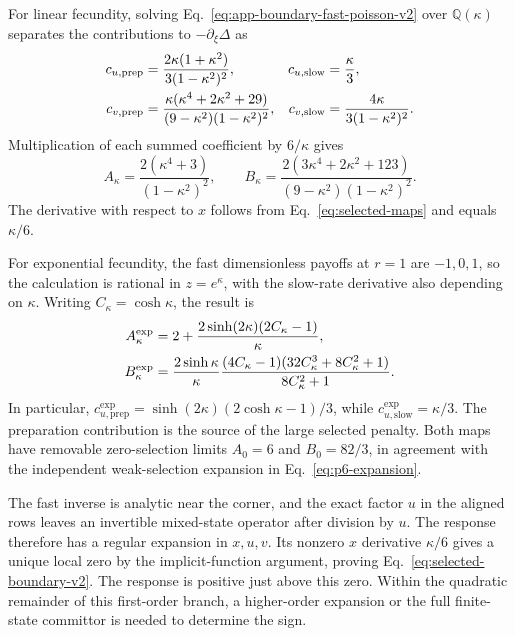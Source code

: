 \documentclass[aps,pre,reprint,amsmath,amssymb,longbibliography]{revtex4-2}
\begin{document}
For linear fecundity, solving
Eq.~\eqref{eq:app-boundary-fast-poisson-v2}
over \(\mathbb Q(\kappa)\) separates the
contributions to \(-\partial_\xi\Delta\) as
\begin{align}
 c_{u,\mathrm{prep}}
 &=\frac{2\kappa(1+\kappa^2)}{3(1-\kappa^2)^2},
 &c_{u,\mathrm{slow}}&=\frac{\kappa}{3}, \label{eq:app-boundary-decomposition-v2}\\
 c_{v,\mathrm{prep}}
 &=\frac{\kappa(\kappa^4+2\kappa^2+29)}
 {(9-\kappa^2)(1-\kappa^2)^2},
 &c_{v,\mathrm{slow}}&=\frac{4\kappa}{3(1-\kappa^2)^2}. \notag
\end{align}
Multiplication of each summed coefficient
by \(6/\kappa\) gives
\begin{equation}
 A_\kappa=\frac{2(\kappa^4+3)}{(1-\kappa^2)^2},\qquad
 B_\kappa=\frac{2(3\kappa^4+2\kappa^2+123)}
                 {(9-\kappa^2)(1-\kappa^2)^2}.
 \label{eq:selected-linear-coefficients-v2}
\end{equation}
The derivative with respect to \(x\) follows
from Eq.~\eqref{eq:selected-maps} and equals
\(\kappa/6\).

For exponential fecundity, the fast dimensionless payoffs
at \(r=1\) are \(-1,0,1\), so the calculation
is rational in \(z=e^\kappa\), with the
slow-rate derivative also depending on
\(\kappa\). Writing \(C_\kappa=\cosh\kappa\),
the result is
\begin{align}
 A_\kappa^{\exp}
 &=2+\frac{2\sinh(2\kappa)(2C_\kappa-1)}{\kappa},
 \notag\\
 B_\kappa^{\exp}
 &=\frac{2\sinh\kappa}{\kappa}
 \frac{(4C_\kappa-1)(32C_\kappa^3+8C_\kappa^2+1)}
      {8C_\kappa^2+1}.
 \label{eq:app-exponential-coefficients-v2}
\end{align}
In particular,
\(c_{u,\mathrm{prep}}^{\exp}
=\sinh(2\kappa)(2\cosh\kappa-1)/3\),
while \(c_{u,\mathrm{slow}}^{\exp}=\kappa/3\).
The preparation contribution is the source
of the large selected penalty. Both maps
have removable zero-selection limits
\(A_0=6\) and \(B_0=82/3\), in agreement
with the independent weak-selection
expansion in Eq.~\eqref{eq:p6-expansion}.

The fast inverse is analytic near the corner,
and the exact factor \(u\) in the aligned
rows leaves an invertible mixed-state
operator after division by \(u\).
The response therefore has a regular
expansion in \(x,u,v\). Its nonzero
\(x\) derivative \(\kappa/6\) gives a unique
local zero by the implicit-function
argument, proving
Eq.~\eqref{eq:selected-boundary-v2}.
The response is positive just above this
zero. Within the quadratic remainder of
this first-order branch, a
higher-order expansion or the full
finite-state committor is needed to
determine the sign.
\end{document}
